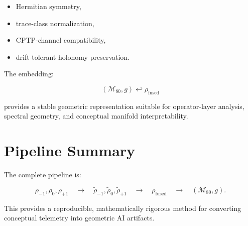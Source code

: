 \documentclass[11pt]{article}
\begin{document}
\begin{itemize}
    \item Hermitian symmetry,
    \item trace-class normalization,
    \item CPTP-channel compatibility,
    \item drift-tolerant holonomy preservation.
\end{itemize}

The embedding:

\[
(\mathcal{M}_{80}, g) \hookleftarrow \rho_{\text{fused}}
\]

provides a stable geometric representation suitable for operator-layer analysis,
spectral geometry, and conceptual manifold interpretability.

\section{Pipeline Summary}

The complete pipeline is:

\[
\rho_{-1}, \rho_{0}, \rho_{+1}
\quad\longrightarrow\quad
\tilde{\rho}_{-1}, \tilde{\rho}_{0}, \tilde{\rho}_{+1}
\quad\longrightarrow\quad
\rho_{\text{fused}}
\quad\longrightarrow\quad
(\mathcal{M}_{80}, g).
\]

This provides a reproducible, mathematically rigorous method for converting conceptual
telemetry into geometric AI artifacts.
\end{document}
